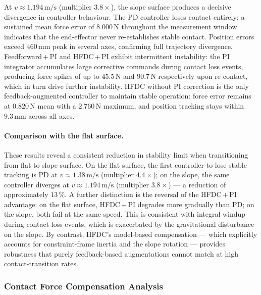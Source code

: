 \documentclass[
	german,%
	accentcolor=9c,%
	ruledheaders=section,%
	class=report,%
	thesis={type=bachelor},%
	fontsize=11pt,%
	parskip=half-,%
	custommargins=true,%
	marginpar=false,%
]{tudapub}
\begin{document}
At $v \approx 1.194\,\mathrm{m/s}$ (multiplier $3.8\times$), the slope
surface produces a decisive divergence in controller behaviour.
The PD controller loses contact entirely: a sustained mean force error of
$8.000\,\mathrm{N}$ throughout the measurement window indicates that the
end-effector never re-establishes stable contact.
Position errors exceed $460\,\mathrm{mm}$ peak in several axes, confirming
full trajectory divergence.
Feedforward\,+\,PI and HFDC\,+\,PI exhibit intermittent instability: the PI
integrator accumulates large corrective commands during contact loss events,
producing force spikes of up to $45.5\,\mathrm{N}$ and $90.7\,\mathrm{N}$
respectively upon re-contact, which in turn drive further instability.
HFDC without PI correction is the only feedback-augmented controller to
maintain stable operation: force error remains at $0.820\,\mathrm{N}$ mean
with a $2.760\,\mathrm{N}$ maximum, and position tracking stays within
$9.3\,\mathrm{mm}$ across all axes.

\paragraph{Comparison with the flat surface.}
These results reveal a consistent reduction in stability limit when
transitioning from flat to slope surface.
On the flat surface, the first controller to lose stable tracking is PD at
$v \approx 1.38\,\mathrm{m/s}$ (multiplier $4.4\times$); on the slope, the
same controller diverges at $v \approx 1.194\,\mathrm{m/s}$ (multiplier
$3.8\times$) — a reduction of approximately $13\,\%$.
A further distinction is the reversal of the HFDC\,+\,PI advantage: on the
flat surface, HFDC\,+\,PI degrades more gradually than PD; on the slope, both
fail at the same speed.
This is consistent with integral windup during contact loss events, which is
exacerbated by the gravitational disturbance on the slope.
By contrast, HFDC's model-based compensation — which explicitly accounts for
constraint-frame inertia and the slope rotation — provides robustness that
purely feedback-based augmentations cannot match at high contact-transition
rates.


\subsubsection{Contact Force Compensation Analysis}
\end{document}
